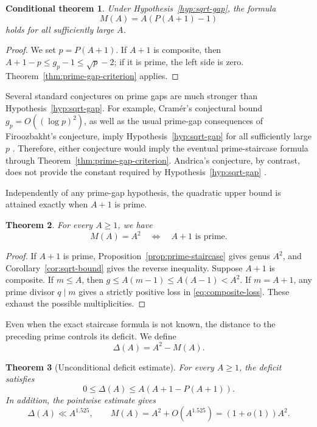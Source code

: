 \documentclass[11pt]{article}
\theoremstyle{plain}
\newtheorem{theorem}{Theorem}[section]
\newtheorem{conditionaltheorem}[theorem]{Conditional theorem}
\theoremstyle{definition}
\theoremstyle{remark}
\begin{document}
\begin{conditionaltheorem}\label{thm:conditional-staircase}
Under Hypothesis~\ref{hyp:sqrt-gap}, the formula
\[
  \boxed{M(A)=A(P(A+1)-1)}
\]
holds for all sufficiently large $A$.
\end{conditionaltheorem}

\begin{proof}
We set $p=P(A+1)$.  If $A+1$ is composite, then
$A+1-p\leq g_p-1\leq\sqrt p-2$; if it is prime, the left side is zero.
Theorem~\ref{thm:prime-gap-criterion} applies.
\end{proof}

Several standard conjectures on prime gaps are much stronger than
Hypothesis~\ref{hyp:sqrt-gap}.  For example, Cram\'er's conjectural bound
$g_p=O((\log p)^2)$, as well as the usual prime-gap consequences of
Firoozbakht's conjecture, imply Hypothesis~\ref{hyp:sqrt-gap} for all
sufficiently large $p$
\cite{cramer-prime-gaps,kourbatov-firoozbakht}.  Therefore, either conjecture
would imply the eventual prime-staircase formula through
Theorem~\ref{thm:prime-gap-criterion}.  Andrica's conjecture, by contrast,
does not provide the constant required by Hypothesis~\ref{hyp:sqrt-gap}
\cite{andrica-conjecture}.

Independently of any prime-gap hypothesis, the quadratic upper bound is
attained exactly when $A+1$ is prime.

\begin{theorem}\label{thm:square-characterization}
For every $A\geq1$, we have
\[
  \boxed{M(A)=A^2\quad\Longleftrightarrow\quad A+1\text{ is prime}.}
\]
\end{theorem}

\begin{proof}
If $A+1$ is prime, Proposition~\ref{prop:prime-staircase} gives genus $A^2$,
and Corollary~\ref{cor:sqrt-bound} gives the reverse inequality.  Suppose
$A+1$ is composite.  If $m\leq A$, then
$g\leq A(m-1)\leq A(A-1)<A^2$.  If $m=A+1$, any prime divisor $q\mid m$
gives a strictly positive loss in \eqref{eq:composite-loss}.  These exhaust
the possible multiplicities.
\end{proof}

Even when the exact staircase formula is not known, the distance to the
preceding prime controls its deficit.  We define
\[
  \Delta(A)=A^2-M(A).
\]

\begin{theorem}[Unconditional deficit estimate]\label{thm:deficit}
For every $A\geq1$, the deficit satisfies
\[
  \boxed{0\leq\Delta(A)\leq A(A+1-P(A+1)).}
\]
In addition, the pointwise estimate gives
\[
  \boxed{\Delta(A)\ll A^{1.525}},
  \qquad
  \boxed{M(A)=A^2+O(A^{1.525})=(1+o(1))A^2}.
\]
\end{theorem}
\end{document}
